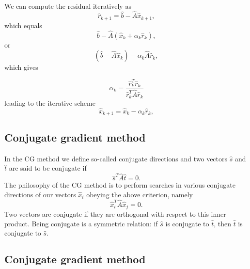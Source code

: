 \documentclass[%
oneside,                 %
final,                   %
10pt]{article}
\begin{document}
\paragraph{}
We can compute the residual iteratively as
\begin{equation*}
\hat{r}_{k+1}=\hat{b}-\hat{A}\hat{x}_{k+1},
 \end{equation*}
which equals
\begin{equation*}
\hat{b}-\hat{A}(\hat{x}_k+\alpha_k\hat{r}_k),
 \end{equation*}
or
\begin{equation*}
(\hat{b}-\hat{A}\hat{x}_k)-\alpha_k\hat{A}\hat{r}_k,
 \end{equation*}
which gives

\[
\alpha_k = \frac{\hat{r}_k^T\hat{r}_k}{\hat{r}_k^T\hat{A}\hat{r}_k}
\]
leading to the iterative scheme
\begin{equation*}
\hat{x}_{k+1}=\hat{x}_k-\alpha_k\hat{r}_{k},
 \end{equation*}



\subsection*{Conjugate gradient method}

\paragraph{}
In the CG method we define so-called conjugate directions and two vectors 
$\hat{s}$ and $\hat{t}$
are said to be
conjugate if
\begin{equation*}
\hat{s}^T\hat{A}\hat{t}= 0.
\end{equation*}
The philosophy of the CG method is to perform searches in various conjugate directions
of our vectors $\hat{x}_i$ obeying the above criterion, namely
\begin{equation*}
\hat{x}_i^T\hat{A}\hat{x}_j= 0.
\end{equation*}
Two vectors are conjugate if they are orthogonal with respect to 
this inner product. Being conjugate is a symmetric relation: if $\hat{s}$ is conjugate to $\hat{t}$, then $\hat{t}$ is conjugate to $\hat{s}$.



\subsection*{Conjugate gradient method}
\end{document}
